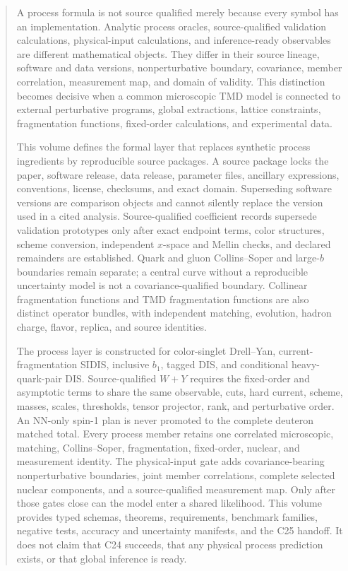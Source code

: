 \documentclass[11pt]{article}
\begin{document}
\begin{abstract}
A process formula is not source qualified merely because every symbol has an implementation.  Analytic process oracles, source-qualified validation calculations, physical-input calculations, and inference-ready observables are different mathematical objects.  They differ in their source lineage, software and data versions, nonperturbative boundary, covariance, member correlation, measurement map, and domain of validity.  This distinction becomes decisive when a common microscopic TMD model is connected to external perturbative programs, global extractions, lattice constraints, fragmentation functions, fixed-order calculations, and experimental data.

This volume defines the formal layer that replaces synthetic process ingredients by reproducible source packages.  A source package locks the paper, software release, data release, parameter files, ancillary expressions, conventions, license, checksums, and exact domain.  Superseding software versions are comparison objects and cannot silently replace the version used in a cited analysis.  Source-qualified coefficient records supersede validation prototypes only after exact endpoint terms, color structures, scheme conversion, independent \(x\)-space and Mellin checks, and declared remainders are established.  Quark and gluon Collins--Soper and large-\(b\) boundaries remain separate; a central curve without a reproducible uncertainty model is not a covariance-qualified boundary.  Collinear fragmentation functions and TMD fragmentation functions are also distinct operator bundles, with independent matching, evolution, hadron charge, flavor, replica, and source identities.

The process layer is constructed for color-singlet Drell--Yan, current-fragmentation SIDIS, inclusive \(b_1\), tagged DIS, and conditional heavy-quark-pair DIS.  Source-qualified \(W+Y\) requires the fixed-order and asymptotic terms to share the same observable, cuts, hard current, scheme, masses, scales, thresholds, tensor projector, rank, and perturbative order.  An NN-only spin-1 plan is never promoted to the complete deuteron matched total.  Every process member retains one correlated microscopic, matching, Collins--Soper, fragmentation, fixed-order, nuclear, and measurement identity.  The physical-input gate adds covariance-bearing nonperturbative boundaries, joint member correlations, complete selected nuclear components, and a source-qualified measurement map.  Only after those gates close can the model enter a shared likelihood.  This volume provides typed schemas, theorems, requirements, benchmark families, negative tests, accuracy and uncertainty manifests, and the C25 handoff.  It does not claim that C24 succeeds, that any physical process prediction exists, or that global inference is ready.
\end{abstract}
\end{document}
